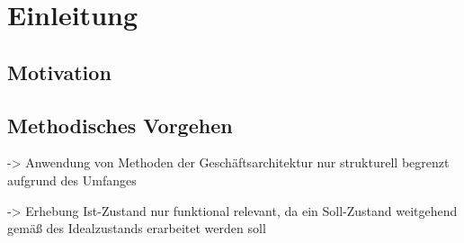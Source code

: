 \chapter{Einleitung}

\section{Motivation}

\section{Methodisches Vorgehen}


-> Anwendung von Methoden der Geschäftsarchitektur nur strukturell begrenzt aufgrund des Umfanges

-> Erhebung Ist-Zustand nur funktional relevant, da ein Soll-Zustand weitgehend gemäß des Idealzustands erarbeitet werden soll